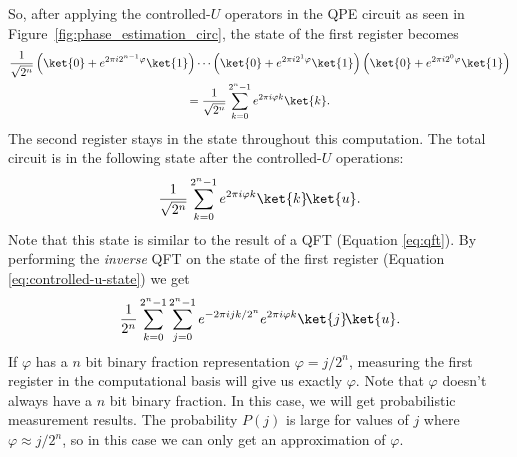 \documentclass[11pt, notitlepage]{report}
\begin{document}
So, after applying the controlled-$U$ operators in the QPE circuit as seen in Figure~\ref{fig:phase_estimation_circ}, the state of the first register becomes
\begin{gather}
  \dfrac{1}{\sqrt{2^n}}\left(\ket{0} + e^{2\pi i 2^{n-1} \varphi}\ket{1}\right)
  \dotsb
  \left(\ket{0} + e^{2\pi i 2^1 \varphi}\ket{1}\right)
  \left(\ket{0} + e^{2\pi i 2^0 \varphi}\ket{1}\right) \\
  = \dfrac{1}{\sqrt{2^n}}\sum_{k=0}^{2^n-1} e^{2\pi i\varphi k}\ket{k}.
\end{gather}
The second register stays in the state  throughout this computation. The total circuit is in the following state after the controlled-$U$ operations:
\begin{equation} \label{eq:controlled-u-state}
  \dfrac{1}{\sqrt{2^n}}\sum_{k=0}^{2^n-1} e^{2\pi i\varphi k}\ket{k}\!\ket{u}.
\end{equation}
Note that this state is similar to the result of a QFT (Equation \ref{eq:qft}). By performing the \emph{inverse} QFT on the state of the first register (Equation \ref{eq:controlled-u-state}) we get
\begin{equation}
  \dfrac{1}{2^n}\sum_{k=0}^{2^n-1}\sum_{j=0}^{2^n-1} e^{-2\pi ijk/2^n} e^{2\pi i\varphi k}\ket{j}\!\ket{u}.
\end{equation}
If $\varphi$ has a $n$ bit binary fraction representation $\varphi = j/2^n$, measuring the first register in the computational basis will give us exactly $\varphi$. Note that $\varphi$ doesn't always have a $n$ bit binary fraction. In this case, we will get probabilistic measurement results. The probability $P(j)$ is large for values of $j$ where $\varphi \approx j/2^n$, so in this case we can only get an approximation of $\varphi$.
\end{document}
